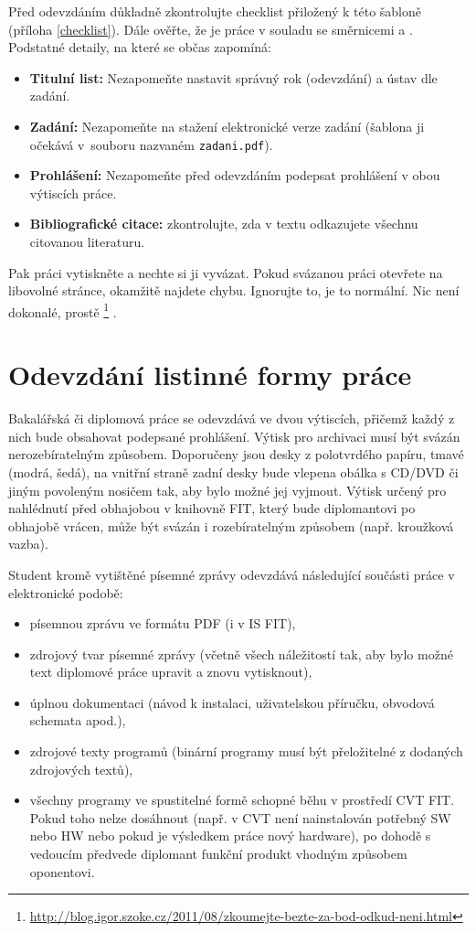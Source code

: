 Před odevzdáním důkladně zkontrolujte checklist přiložený k této šabloně (příloha \ref{checklist}). Dále ověřte, že je práce v souladu se směrnicemi \cite{smernice} a \cite{smerniceFIT}. Podstatné detaily, na které se občas zapomíná:
\begin{itemize}
	\item \textbf{Titulní list:} Nezapomeňte nastavit správný rok (odevzdání) a ústav dle zadání.
    \item \textbf{Zadání:} Nezapomeňte na stažení elektronické verze zadání (šablona ji očekává v~souboru nazvaném \texttt{zadani.pdf}).
    \item \textbf{Prohlášení:} Nezapomeňte před odevzdáním podepsat prohlášení v obou výtiscích práce.
    \item \textbf{Bibliografické citace:} zkontrolujte, zda v textu odkazujete všechnu citovanou literaturu.
\end{itemize}

Pak práci vytiskněte a nechte si ji vyvázat. Pokud svázanou práci otevřete na libovolné stránce, okamžitě najdete chybu. Ignorujte to, je to normální. Nic není dokonalé, prostě \footnote{\url{http://blog.igor.szoke.cz/2011/08/zkoumejte-bezte-za-bod-odkud-neni.html}} \cite{rady}.


\section{Odevzdání listinné formy práce}

Bakalářská či diplomová práce se odevzdává ve dvou výtiscích, přičemž každý z nich bude obsahovat podepsané prohlášení. Výtisk pro archivaci musí být svázán nerozebíratelným způsobem. Doporučeny jsou desky z polotvrdého papíru, tmavé (modrá, šedá), na vnitřní straně zadní desky bude vlepena obálka s CD/DVD či jiným povoleným nosičem tak, aby bylo možné jej vyjmout. Výtisk určený pro nahlédnutí před obhajobou v knihovně FIT, který bude diplomantovi po obhajobě vrácen, může být svázán i rozebíratelným způsobem (např. kroužková vazba).

Student kromě vytištěné písemné zprávy odevzdává následující součásti práce v elektronické podobě:
\begin{itemize}
  \item{písemnou zprávu ve formátu PDF (i v IS FIT),}
  \item{zdrojový tvar písemné zprávy (včetně všech náležitostí tak, aby bylo možné text diplomové práce upravit a znovu vytisknout),}
  \item{úplnou dokumentaci (návod k instalaci, uživatelskou příručku, obvodová schemata apod.),}
  \item{zdrojové texty programů (binární programy musí být přeložitelné z dodaných zdrojových textů),}
  \item{všechny programy ve spustitelné formě schopné běhu v prostředí CVT FIT. Pokud toho nelze dosáhnout (např. v CVT není nainstalován potřebný SW nebo HW nebo pokud je výsledkem práce nový hardware), po dohodě s vedoucím předvede diplomant funkční produkt vhodným způsobem oponentovi.}
\end{itemize}

